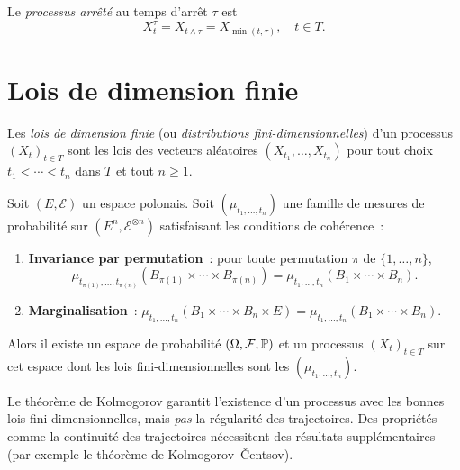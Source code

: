 \begin{definition}
Le \emph{processus arr\^et\'e} au temps d'arr\^et $\tau$ est
\[
  X_t^{\tau} = X_{t \wedge \tau} = X_{\min(t, \tau)}, \quad t \in T.
\]
\end{definition}

\section{Lois de dimension finie}

\begin{definition}
Les \emph{lois de dimension finie} (ou \emph{distributions fini-dimensionnelles})
d'un processus $(X_t)_{t \in T}$ sont les lois des vecteurs al\'eatoires
$(X_{t_1}, \ldots, X_{t_n})$ pour tout choix $t_1 < \cdots < t_n$ dans $T$ et
tout $n \geq 1$.
\end{definition}

\begin{theoreme}
\label{thm:kolmogorov_extension}
Soit $(E, \mathcal{E})$ un espace polonais. Soit $(\mu_{t_1, \ldots, t_n})$
une famille de mesures de probabilit\'e sur $(E^n, \mathcal{E}^{\otimes n})$
satisfaisant les conditions de coh\'erence~:
\begin{enumerate}
  \item \textbf{Invariance par permutation}~: pour toute permutation $\pi$ de
    $\{1, \ldots, n\}$,
    \[
      \mu_{t_{\pi(1)}, \ldots, t_{\pi(n)}}(B_{\pi(1)} \times \cdots \times B_{\pi(n)})
      = \mu_{t_1, \ldots, t_n}(B_1 \times \cdots \times B_n).
    \]
  \item \textbf{Marginalisation}~:
    $\mu_{t_1, \ldots, t_n}(B_1 \times \cdots \times B_n \times E) = \mu_{t_1, \ldots, t_n}(B_1 \times \cdots \times B_n)$.
\end{enumerate}
Alors il existe un espace de probabilit\'e $(\Omega, \mathcal{F}, \mathbb{P})$ et un
processus $(X_t)_{t \in T}$ sur cet espace dont les lois fini-dimensionnelles
sont les $(\mu_{t_1, \ldots, t_n})$.
\end{theoreme}

\begin{attention}[title=\textbf{Limites du th\'eor\`eme de Kolmogorov}]
Le th\'eor\`eme de Kolmogorov garantit l'existence d'un processus avec les bonnes
lois fini-dimensionnelles, mais \emph{pas} la r\'egularit\'e des trajectoires.
Des propri\'et\'es comme la continuit\'e des trajectoires n\'ecessitent des r\'esultats
suppl\'ementaires (par exemple le th\'eor\`eme de Kolmogorov--\v{C}entsov).
\end{attention}

